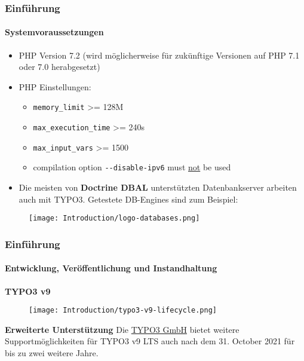 \begin{frame}[fragile]
	\frametitle{Einführung}
	\framesubtitle{Systemvoraussetzungen}

	\begin{itemize}
		\item PHP Version 7.2\newline
			\smaller
				(wird möglicherweise für zukünftige Versionen auf PHP 7.1 oder 7.0 herabgesetzt)
			\normalsize

		\item PHP Einstellungen:

			\begin{itemize}
				\item \texttt{memory\_limit} >= 128M
				\item \texttt{max\_execution\_time} >= 240s
				\item \texttt{max\_input\_vars} >= 1500
				\item compilation option \texttt{-}\texttt{-disable-ipv6} must \underline{not} be used
			\end{itemize}

		\item Die meisten von \textbf{Doctrine DBAL} unterstützten Datenbankserver arbeiten auch mit TYPO3.
			Getestete DB-Engines sind zum Beispiel:
	\end{itemize}

	\begin{figure}
		\texttt{[image: Introduction/logo-databases.png]}
	\end{figure}

\end{frame}

\begin{frame}[fragile]
	\frametitle{Einführung}
	\framesubtitle{Entwicklung, Veröffentlichung und Instandhaltung}

	\textbf{TYPO3 v9}

	\begin{figure}
		\texttt{[image: Introduction/typo3-v9-lifecycle.png]}
	\end{figure}

	\textbf{Erweiterte Unterstützung}\newline
	\smaller
		Die \href{https://typo3.com}{TYPO3 GmbH} bietet weitere Supportmöglichkeiten
		für TYPO3 v9 LTS auch nach dem 31. October 2021 für bis zu zwei weitere Jahre.
	\normalsize


\end{frame}

